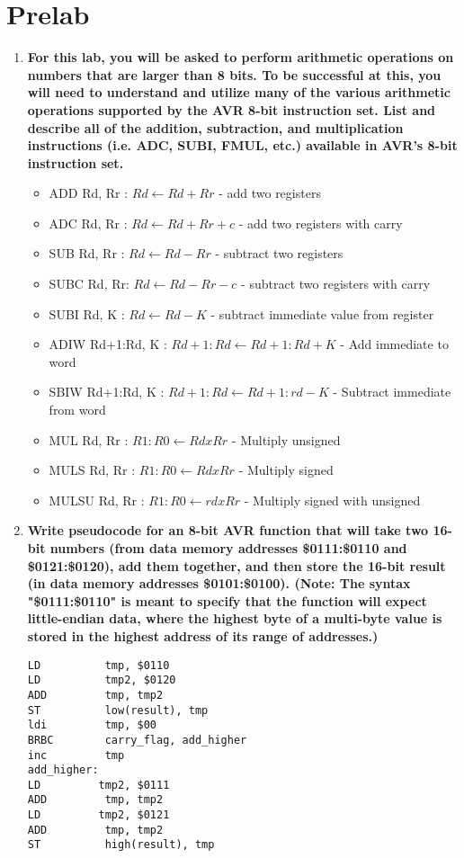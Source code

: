 \documentclass[12pt,letterpaper]{article}
\begin{document}
\section{Prelab}
\begin{enumerate}
  \item \textbf{For this lab, you will be asked to perform arithmetic operations on numbers that are larger than 8 bits. To be successful at this, you will need to understand and utilize many of the various arithmetic operations supported by the AVR 8-bit instruction set. List and describe all of the addition, subtraction, and multiplication instructions (i.e. ADC, SUBI, FMUL, etc.) available in AVR’s 8-bit instruction set.}\\
  \begin{itemize}
    \item ADD Rd, Rr : $Rd \leftarrow Rd + Rr$ - add two registers
    \item ADC Rd, Rr : $Rd \leftarrow Rd + Rr + c$ - add two registers with carry
    \item SUB Rd, Rr : $Rd \leftarrow Rd - Rr $ - subtract two registers
    \item SUBC Rd, Rr: $Rd \leftarrow Rd - Rr - c$ - subtract two registers with carry
    \item SUBI Rd, K : $Rd \leftarrow Rd - K$ - subtract immediate value from register
    \item ADIW Rd+1:Rd, K : $Rd+1:Rd \leftarrow Rd+1:Rd + K$ - Add immediate to word
    \item SBIW Rd+1:Rd, K : $Rd+1:Rd \leftarrow Rd+1:rd - K$ - Subtract immediate from word
    \item MUL Rd, Rr      : $R1:R0 \leftarrow Rd x Rr$ - Multiply unsigned
    \item MULS Rd, Rr     : $R1:R0 \leftarrow Rd x Rr$ - Multiply signed
    \item MULSU Rd, Rr    : $R1:R0 \leftarrow rd x Rr$ - Multiply signed with unsigned
    \end{itemize}

  \item \textbf{Write pseudocode for an 8-bit AVR function that will take two 16-bit numbers (from data memory addresses \$0111:\$0110 and \$0121:\$0120), add them together, and then store the 16-bit result (in data memory addresses \$0101:\$0100). (Note: The syntax "\$0111:\$0110" is meant to specify that the function will expect little-endian data, where the highest byte of a multi-byte value is stored in the highest address of its range of addresses.)}\\
    \begin{verbatim}
LD          tmp, $0110
LD          tmp2, $0120
ADD         tmp, tmp2
ST          low(result), tmp
ldi         tmp, $00
BRBC        carry_flag, add_higher
inc         tmp
add_higher:
LD         tmp2, $0111
ADD         tmp, tmp2
LD         tmp2, $0121
ADD         tmp, tmp2
ST          high(result), tmp
    \end{verbatim}



\end{enumerate}
\end{document}
